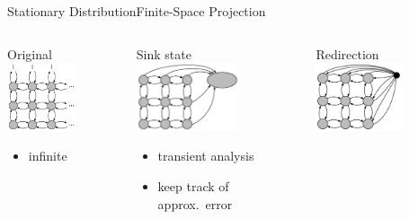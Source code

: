 \documentclass{beamer}
\begin{document}
\begin{frame}{Stationary Distribution}{Finite-Space Projection}
    \begin{columns}
        \begin{column}{.30\textwidth}
            \begin{block}{Original}
                \centering
                \vspace{3mm}
                \includegraphics[height=2cm]{../gfx/state_space_untrunc.pdf}
                {\small
                \begin{itemize}
                    \item infinite
                \end{itemize}
                }
            \end{block}
        \end{column}
        \begin{column}{.30\textwidth}
            \begin{block}{Sink state}
                \centering
                \vspace{3mm}
                \includegraphics[height=2cm]{../gfx/state_space_redirected.pdf}
                {\small
                \begin{itemize}
                    \item transient analysis
                    \item keep track of approx.\ error
                \end{itemize}
                }
            \end{block}
        \end{column}
        \begin{column}{.30\textwidth}
            \begin{block}{Redirection}
                \centering
                \vspace{3mm}
                \includegraphics[height=2cm]{../gfx/state_space_reentry.pdf}

\end{block}
\end{column}
\end{columns}
\end{frame}
\end{document}
